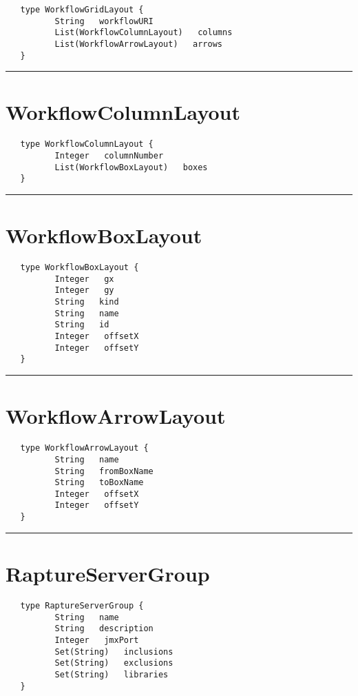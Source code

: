 \begin{verbatim}
   type WorkflowGridLayout {
          String   workflowURI
          List(WorkflowColumnLayout)   columns
          List(WorkflowArrowLayout)   arrows
   }
\end{verbatim}

\rule{15cm}{2pt}
\section{WorkflowColumnLayout}
\label{type:WorkflowColumnLayout}

\begin{verbatim}
   type WorkflowColumnLayout {
          Integer   columnNumber
          List(WorkflowBoxLayout)   boxes
   }
\end{verbatim}

\rule{15cm}{2pt}
\section{WorkflowBoxLayout}
\label{type:WorkflowBoxLayout}

\begin{verbatim}
   type WorkflowBoxLayout {
          Integer   gx
          Integer   gy
          String   kind
          String   name
          String   id
          Integer   offsetX
          Integer   offsetY
   }
\end{verbatim}

\rule{15cm}{2pt}
\section{WorkflowArrowLayout}
\label{type:WorkflowArrowLayout}

\begin{verbatim}
   type WorkflowArrowLayout {
          String   name
          String   fromBoxName
          String   toBoxName
          Integer   offsetX
          Integer   offsetY
   }
\end{verbatim}

\rule{15cm}{2pt}
\section{RaptureServerGroup}
\label{type:RaptureServerGroup}

\begin{verbatim}
   type RaptureServerGroup {
          String   name
          String   description
          Integer   jmxPort
          Set(String)   inclusions
          Set(String)   exclusions
          Set(String)   libraries
   }
\end{verbatim}


